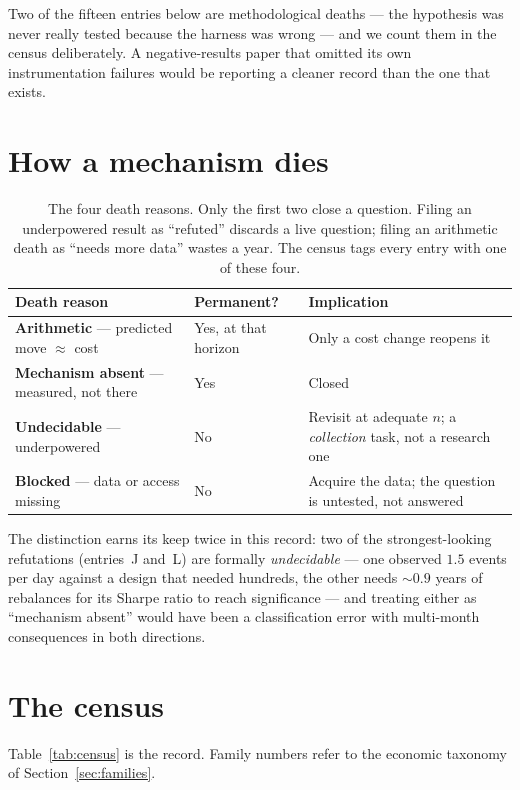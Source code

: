 \documentclass[11pt,a4paper]{article}
\newcommand{\toprule}{\hline\hline}
\newcommand{\midrule}{\hline}
\newcommand{\bottomrule}{\hline\hline}
\begin{document}
Two of the fifteen entries below are methodological deaths --- the
hypothesis was never really tested because the harness was wrong --- and
we count them in the census deliberately. A negative-results paper that
omitted its own instrumentation failures would be reporting a cleaner
record than the one that exists.

\section{How a mechanism dies}
\label{sec:deaths}

\begin{table}[h]
\centering
\begin{tabular}{p{4.2cm} p{2.2cm} p{7.4cm}}
\toprule
Death reason & Permanent? & Implication \\
\midrule
\textbf{Arithmetic} --- predicted move $\approx$ cost & Yes, at that
horizon & Only a cost change reopens it \\
\textbf{Mechanism absent} --- measured, not there & Yes & Closed \\
\textbf{Undecidable} --- underpowered & No & Revisit at adequate $n$; a
\emph{collection} task, not a research one \\
\textbf{Blocked} --- data or access missing & No & Acquire the data;
the question is untested, not answered \\
\bottomrule
\end{tabular}
\caption{The four death reasons. Only the first two close a question.
Filing an underpowered result as ``refuted'' discards a live question;
filing an arithmetic death as ``needs more data'' wastes a year. The
census tags every entry with one of these four.}
\label{tab:deaths}
\end{table}

The distinction earns its keep twice in this record: two of the
strongest-looking refutations (entries~J and~L) are formally
\emph{undecidable} --- one observed $1.5$ events per day against a
design that needed hundreds, the other needs ${\sim}0.9$ years of
rebalances for its Sharpe ratio to reach significance --- and treating
either as ``mechanism absent'' would have been a classification error
with multi-month consequences in both directions.

\section{The census}
\label{sec:census}

Table~\ref{tab:census} is the record. Family numbers refer to the
economic taxonomy of Section~\ref{sec:families}.
\end{document}
